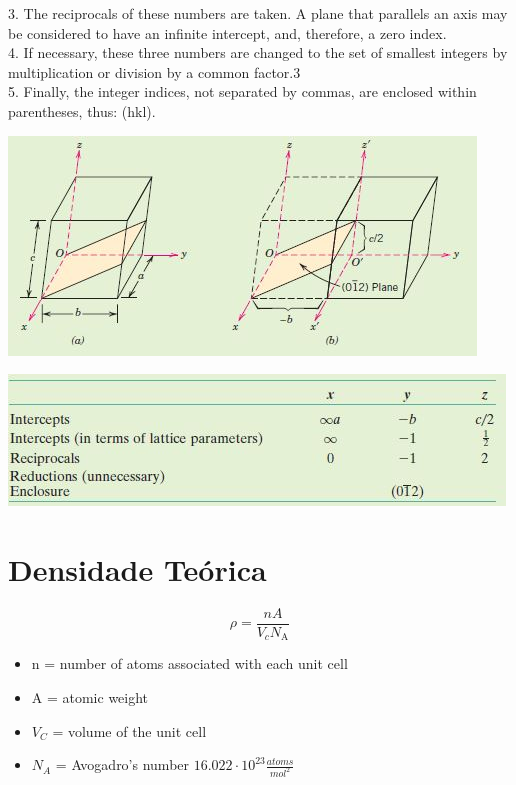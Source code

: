 3. The reciprocals of these numbers are taken. A plane that parallels an axis
may be considered to have an infinite intercept, and, therefore, a zero index.
\\

4. If necessary, these three numbers are changed to the set of smallest integers
by multiplication or division by a common factor.3
\\

5. Finally, the integer indices, not separated by commas, are enclosed within
parentheses, thus: (hkl).


\includegraphics[scale=0.55,trim={0 0 0 0}]{figures/planSum1}

\includegraphics[scale=0.5,trim={0 0 0 0}]{figures/planSum2}


\section{Densidade Teórica}

\begin{equation}\label{key}
\rho=\frac{n A}{V_{c} N_{\mathrm{A}}}
\end{equation}

\begin{itemize}
	\item n = number of atoms associated with each unit cell
	\item A = atomic weight
	\item $V_{C}$ = volume of the unit cell
	\item $N_{A}$ = Avogadro’s number $16.022 \cdot 10^{23} \frac{atoms}{mol^{2}}$
\end{itemize}


